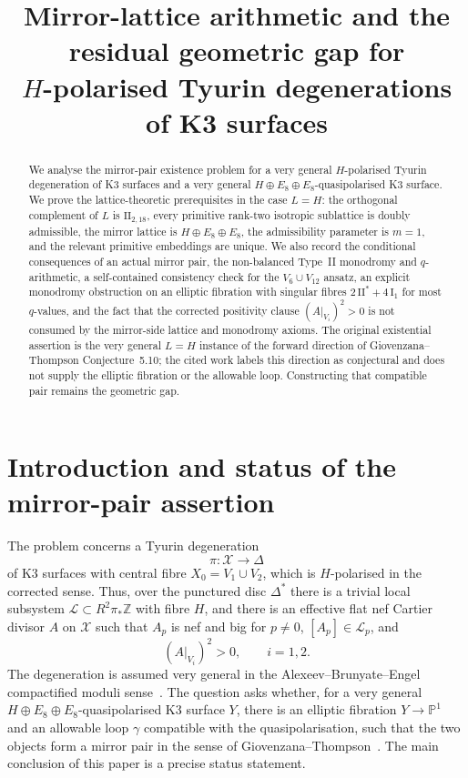 \documentclass[12pt]{article}
\theoremstyle{plain}
\theoremstyle{definition}
\newcommand{\bZ}{\mathbb{Z}}
\newcommand{\bP}{\mathbb{P}}
\newcommand{\cL}{\mathcal{L}}
\newcommand{\cX}{\mathcal{X}}
\begin{document}
\title{Mirror-lattice arithmetic and the residual geometric gap for\\
$H$-polarised Tyurin degenerations of K3 surfaces}

\author{}

\maketitle

\begin{abstract}
We analyse the mirror-pair existence problem for a very general $H$-polarised Tyurin degeneration of K3 surfaces and a very general $H\oplus E_8\oplus E_8$-quasipolarised K3 surface.  We prove the lattice-theoretic prerequisites in the case $L=H$: the orthogonal complement of $L$ is $\mathrm{II}_{2,18}$, every primitive rank-two isotropic sublattice is doubly admissible, the mirror lattice is $H\oplus E_8\oplus E_8$, the admissibility parameter is $m=1$, and the relevant primitive embeddings are unique.  We also record the conditional consequences of an actual mirror pair, the non-balanced Type~II monodromy and $q$-arithmetic, a self-contained consistency check for the $V_6\cup V_{12}$ ansatz, an explicit monodromy obstruction on an elliptic fibration with singular fibres $2\,\mathrm{II}^*+4\,\mathrm{I}_1$ for most $q$-values, and the fact that the corrected positivity clause $(A|_{V_i})^2>0$ is not consumed by the mirror-side lattice and monodromy axioms.  The original existential assertion is the very general $L=H$ instance of the forward direction of Giovenzana--Thompson Conjecture~5.10; the cited work labels this direction as conjectural and does not supply the elliptic fibration or the allowable loop.  Constructing that compatible pair remains the geometric gap.
\end{abstract}

\section{Introduction and status of the mirror-pair assertion}

The problem concerns a Tyurin degeneration
\[
\pi\colon \cX\to \Delta
\]
of K3 surfaces with central fibre $X_0=V_1\cup V_2$, which is $H$-polarised in the corrected sense.  Thus, over the punctured disc $\Delta^*$ there is a trivial local subsystem $\cL\subset R^2\pi_*\bZ$ with fibre $H$, and there is an effective flat nef Cartier divisor $A$ on $\cX$ such that $A_p$ is nef and big for $p\neq 0$, $[A_p]\in \cL_p$, and
\[
(A|_{V_i})^2>0,\qquad i=1,2.
\]
The degeneration is assumed very general in the Alexeev--Brunyate--Engel compactified moduli sense~\cite{ABE22}.  The question asks whether, for a very general $H\oplus E_8\oplus E_8$-quasipolarised K3 surface $Y$, there is an elliptic fibration $Y\to \bP^1$ and an allowable loop $\gamma$ compatible with the quasipolarisation, such that the two objects form a mirror pair in the sense of Giovenzana--Thompson~\cite{GT24}.
The main conclusion of this paper is a precise status statement.
\end{document}
